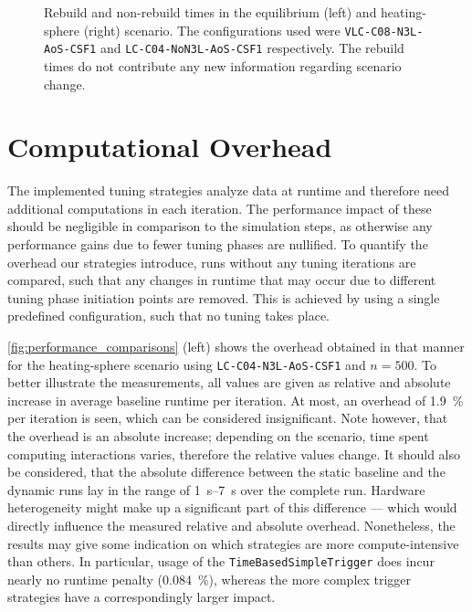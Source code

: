 \begin{figure}[htpb]
\begin{subfigure}[t]{0.45\textwidth}
	\end{subfigure}
	\caption{Rebuild and non-rebuild times in the equilibrium (left) and heating-sphere (right) scenario. The configurations used were \texttt{VLC-C08-N3L-AoS-CSF1} and \texttt{LC-C04-NoN3L-AoS-CSF1} respectively. The rebuild times do not contribute any new information regarding scenario change.}
	\label{fig:rebuild_times}
\end{figure}



\section{Computational Overhead}
\label{sec:overhead_results}
The implemented tuning strategies analyze data at runtime and therefore need additional computations in each iteration. The performance impact of these should be negligible in comparison to the simulation steps, as otherwise any performance gains due to fewer tuning phases are nullified.
To quantify the overhead our strategies introduce, runs without any tuning iterations are compared, such that any changes in runtime that may occur due to different tuning phase initiation points are removed. This is achieved by using a single predefined configuration, such that no tuning takes place.

\autoref{fig:performance_comparisons} (left) shows the overhead obtained in that manner for the heating-sphere scenario using \texttt{LC-C04-N3L-AoS-CSF1} and $n=500$. To better illustrate the measurements, all values are given as relative and absolute increase in average baseline runtime per iteration.
At most, an overhead of \qty{1.9}{\percent} per iteration is seen, which can be considered insignificant. Note however, that the overhead is an absolute increase; depending on the scenario, time spent computing interactions varies, therefore the relative values change. It should also be considered, that the absolute difference between the static baseline and the dynamic runs lay in the range of \SIrange{1}{7}{\second} over the complete run. Hardware heterogeneity might make up a significant part of this difference --- which would directly influence the measured relative and absolute overhead. Nonetheless, the results may give some indication on which strategies are more compute-intensive than others. In particular, usage of the \texttt{TimeBasedSimpleTrigger} does incur nearly no runtime penalty (\qty{0.084}{\percent}), whereas the more complex trigger strategies have a correspondingly larger impact.

